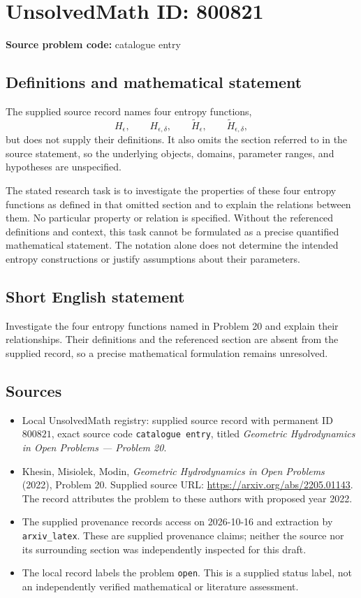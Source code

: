 \documentclass[11pt]{article}
\begin{document}
\section*{UnsolvedMath ID: 800821}
\textbf{Source problem code:} catalogue entry
\subsection{Definitions and mathematical statement}
The supplied source record names four entropy functions,
\[
H_\epsilon,\qquad H_{\epsilon,\delta},\qquad \tilde{H}_\epsilon,\qquad \tilde{H}_{\epsilon,\delta},
\]
but does not supply their definitions. It also omits the section referred to in the source statement, so the underlying objects, domains, parameter ranges, and hypotheses are unspecified.

The stated research task is to investigate the properties of these four entropy functions as defined in that omitted section and to explain the relations between them. No particular property or relation is specified. Without the referenced definitions and context, this task cannot be formulated as a precise quantified mathematical statement. The notation alone does not determine the intended entropy constructions or justify assumptions about their parameters.
\subsection{Short English statement}
Investigate the four entropy functions named in Problem 20 and explain their relationships. Their definitions and the referenced section are absent from the supplied record, so a precise mathematical formulation remains unresolved.
\subsection{Sources}
\begin{itemize}
\item Local UnsolvedMath registry: supplied source record with permanent ID \(800821\), exact source code \texttt{catalogue entry}, titled \emph{Geometric Hydrodynamics in Open Problems --- Problem 20}.
\item Khesin, Misiolek, Modin, \emph{Geometric Hydrodynamics in Open Problems} (2022), Problem 20. Supplied source URL: \url{https://arxiv.org/abs/2205.01143}. The record attributes the problem to these authors with proposed year 2022.
\item The supplied provenance records access on 2026-10-16 and extraction by \texttt{arxiv\_latex}. These are supplied provenance claims; neither the source nor its surrounding section was independently inspected for this draft.
\item The local record labels the problem \texttt{open}. This is a supplied status label, not an independently verified mathematical or literature assessment.
\end{itemize}
\end{document}
